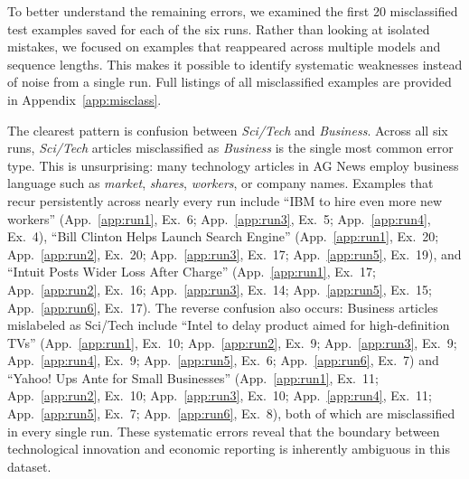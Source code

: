 To better understand the remaining errors, we examined the first 20 misclassified test examples saved for each of the six runs. Rather than looking at isolated mistakes, we focused on examples that reappeared across multiple models and sequence lengths. This makes it possible to identify systematic weaknesses instead of noise from a single run. Full listings of all misclassified examples are provided in Appendix~\ref{app:misclass}.

The clearest pattern is confusion between \textit{Sci/Tech} and \textit{Business}. Across all six runs, \textit{Sci/Tech} articles misclassified as \textit{Business} is the single most common error type. This is unsurprising: many technology articles in AG News employ business language such as \textit{market}, \textit{shares}, \textit{workers}, or company names. Examples that recur persistently across nearly every run include ``IBM to hire even more new workers'' (App.~\ref{app:run1}, Ex.~6; App.~\ref{app:run3}, Ex.~5; App.~\ref{app:run4}, Ex.~4), ``Bill Clinton Helps Launch Search Engine'' (App.~\ref{app:run1}, Ex.~20; App.~\ref{app:run2}, Ex.~20; App.~\ref{app:run3}, Ex.~17; App.~\ref{app:run5}, Ex.~19), and ``Intuit Posts Wider Loss After Charge'' (App.~\ref{app:run1}, Ex.~17; App.~\ref{app:run2}, Ex.~16; App.~\ref{app:run3}, Ex.~14; App.~\ref{app:run5}, Ex.~15; App.~\ref{app:run6}, Ex.~17). The reverse confusion also occurs: Business articles mislabeled as Sci/Tech include ``Intel to delay product aimed for high-definition TVs'' (App.~\ref{app:run1}, Ex.~10; App.~\ref{app:run2}, Ex.~9; App.~\ref{app:run3}, Ex.~9; App.~\ref{app:run4}, Ex.~9; App.~\ref{app:run5}, Ex.~6; App.~\ref{app:run6}, Ex.~7) and ``Yahoo! Ups Ante for Small Businesses'' (App.~\ref{app:run1}, Ex.~11; App.~\ref{app:run2}, Ex.~10; App.~\ref{app:run3}, Ex.~10; App.~\ref{app:run4}, Ex.~11; App.~\ref{app:run5}, Ex.~7; App.~\ref{app:run6}, Ex.~8), both of which are misclassified in every single run. These systematic errors reveal that the boundary between technological innovation and economic reporting is inherently ambiguous in this dataset.

